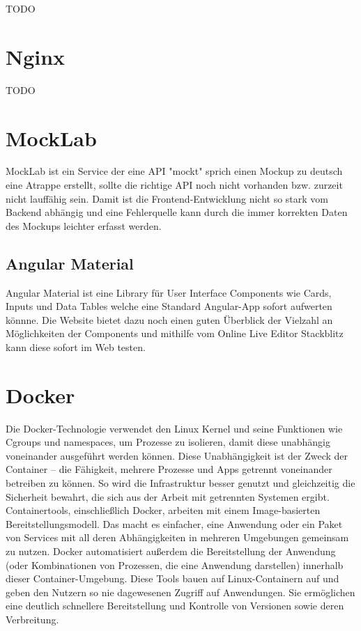 TODO

\section{Nginx}

TODO

\section{MockLab}

MockLab ist ein Service der eine API "mockt" sprich einen Mockup zu deutsch eine Atrappe erstellt, sollte die richtige API noch nicht vorhanden bzw. zurzeit nicht lauffähig sein.
Damit ist die Frontend-Entwicklung nicht so stark vom Backend abhängig und eine Fehlerquelle kann durch die immer korrekten Daten des Mockups leichter erfasst werden.
\cite{sysarch-mocklab-1}

\subsection{Angular Material}
Angular Material ist eine Library für User Interface Components wie Cards, Inputs und Data Tables welche eine Standard Angular-App sofort aufwerten könnne.
Die Website bietet dazu noch einen guten Überblick der Vielzahl an Möglichkeiten der Components und mithilfe vom Online Live Editor Stackblitz kann diese sofort im Web testen. 
\cite{sysarch-angularMaterial-1} 

\section{Docker}

Die Docker-Technologie verwendet den Linux Kernel und seine Funktionen wie Cgroups und namespaces, um Prozesse zu isolieren, damit diese unabhängig voneinander ausgeführt werden können. 
Diese Unabhängigkeit ist der Zweck der Container – die Fähigkeit, mehrere Prozesse und Apps getrennt voneinander betreiben zu können. 
So wird die Infrastruktur besser genutzt und gleichzeitig die Sicherheit bewahrt, die sich aus der Arbeit mit getrennten Systemen ergibt.
Containertools, einschließlich Docker, arbeiten mit einem Image-basierten Bereitstellungsmodell. Das macht es einfacher, eine Anwendung oder ein Paket von Services mit all deren 
Abhängigkeiten in mehreren Umgebungen gemeinsam zu nutzen. Docker automatisiert außerdem die Bereitstellung der Anwendung 
(oder Kombinationen von Prozessen, die eine Anwendung darstellen) innerhalb dieser Container-Umgebung. Diese Tools bauen auf Linux-Containern auf 
und geben den Nutzern so nie dagewesenen Zugriff auf Anwendungen. Sie ermöglichen eine deutlich schnellere Bereitstellung und Kontrolle von Versionen sowie deren Verbreitung.
\cite{sysarch-docker-1}

